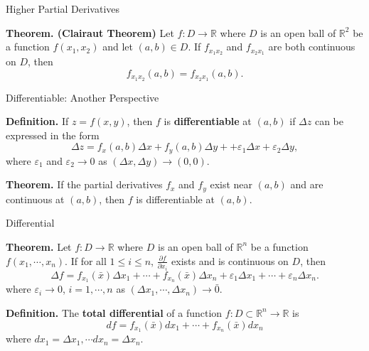 \documentclass[aspectratio=169, UTF8]{ctexbeamer}
\begin{document}
    \begin{frame}[t]{Higher Partial Derivatives}
        \begin{block}
            \par \textbf{Theorem. (Clairaut Theorem)} Let $f: D \to \mathbb{R}$ where $D$ is an open ball of $\mathbb{R}^2$ be a function $f(x_1, x_2)$ and let $(a,b) \in D$. If $f_{x_1x_2}$ and $f_{x_2x_1}$ are both continuous on $D$, then 
            \begin{equation*}
                f_{x_1x_2} (a,b) = f_{x_2x_1} (a,b).
            \end{equation*}
        \end{block}

        \begin{block}{Differentiable: Another Perspective}
            \par \textbf{Definition.} If $z = f(x,y)$, then $f$ is \textbf{differentiable} at $(a,b)$ if $\Delta z$ can be expressed in the form 
            \begin{equation*}
                \Delta z = f_x(a,b) \Delta x + f_y(a,b) \Delta y ++ \varepsilon_1 \Delta x + \varepsilon_2 \Delta y,
            \end{equation*}
            where $\varepsilon_1$ and $\varepsilon_2 \to 0$ as $(\Delta x, \Delta y) \to (0,0)$.

            \par \textbf{Theorem.} If the partial derivatives $f_x$ and $f_y$ exist near $(a,b)$ and are continuous at $(a,b)$, then $f$ is differentiable at $(a,b)$.
        \end{block}
    \end{frame}

    \begin{frame}[t]{Differential}
        \begin{block}
            \par \textbf{Theorem.} Let $f: D \to \mathbb{R}$ where $D$ is an open ball of $\mathbb{R}^n$ be a function $f(x_1,\cdots, x_n)$. If for all $1 \leq i \leq n$, $\frac{\partial f}{\partial x_i}$ exists and is continuous on $D$, then 
            \begin{equation*}
                \Delta f = f_{x_1} (\bar{x}) \Delta x_1 + \cdots + f_{x_n} (\bar{x}) \Delta x_n + \varepsilon_1 \Delta x_1 + \cdots + \varepsilon_n \Delta x_n.
            \end{equation*}
            where $\varepsilon_i \to 0$, $i = 1, \cdots, n$ as $(\Delta x_1, \cdots, \Delta x_n) \to \bar{0}$.
        \end{block}
        \begin{block}
            \par \textbf{Definition.} The \textbf{total differential} of a function $f:D \subset \mathbb{R}^n \to \mathbb{R}$ is 
            \begin{equation*}
                df = f_{x_1} (\bar{x}) d x_1 + \cdots + f_{x_n} (\bar{x}) d x_n
            \end{equation*}
            where $dx_1 = \Delta x_1, \cdots dx_n = \Delta x_n$. 
        \end{block}
    \end{frame}
    
\end{document}

